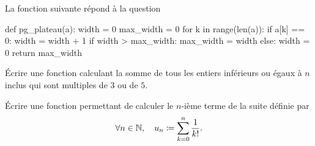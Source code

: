 \documentclass{magnolia}
\begin{document}
\begin{sol}
La fonction suivante répond à la question
\begin{pythoncodeline}
def pg_plateau(a):
    width = 0
    max_width = 0
    for k in range(len(a)):
        if a[k] == 0:
            width = width + 1
            if width > max_width:
                max_width = width
        else:
            width = 0
    return max_width
\end{pythoncodeline}
\end{sol}


Écrire une fonction calculant la somme de tous les entiers inférieurs ou égaux à $n$ inclus
qui sont multiples de $3$ ou de $5$.

Écrire une fonction permettant de calculer le $n$-ième terme de la suite définie par
\[\forall n\in\mathbb{N} ,\quad u_n\coloneqq\sum_{k=0}^n \frac{1}{k!}.\]
\end{document}

